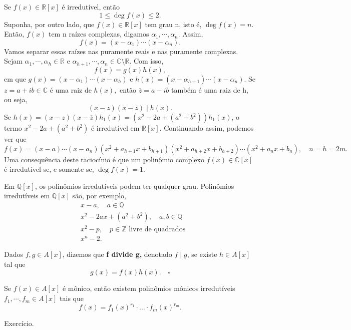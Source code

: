 \documentclass[algebraII_notes.tex]{subfiles}
\begin{document}
Se \(f(x)\in \mathbb{R}[x]\) é irredutível, então
\[
	1\leq \deg{f(x)}\leq 2.
\]
Suponha, por outro lado, que \(f(x)\in \mathbb{R}[x]\) tem grau n, isto é, \(\deg{f(x)} = n.\) Então, \(f(x)\) tem n raízes complexas,
digamos \(\alpha_{1}, \cdots, \alpha_{n}\). Assim,
\[
	f(x) = (x-\alpha_{1})\cdots(x-\alpha_{n}).
\]
Vamos separar essas raízes nas puramente reais e nas puramente complexas. Sejam \(\alpha_{1}, \cdots, \alpha_{h}\in \mathbb{R}\) e
\(\alpha_{h+1}, \cdots, \alpha_{n}\in \mathbb{C}\setminus{\mathbb{R}}.\) Com isso,
\[
	f(x) = g(x)h(x),
\]
em que \(g(x) = (x-\alpha_{1})\cdots(x-\alpha_{h})\) e \(h(x) = (x-\alpha_{h+1})\cdots(x-\alpha_{n}).\)
Se \(z = a + ib\in \mathbb{C}\) é uma raiz de \(h(x),\) então \(\overline{z} = a - ib\) também é uma raiz de h, ou seja,
\[
	(x-z)(x-\overline{z})\mid h(x).
\]
Se \(h(x) = (x-z)(x-\overline{z})h_{1}(x) = (x^{2}-2a + (a^{2}+b^{2}))h_{1}(x)\), o termo
\(x^{2}-2a + (a^{2}+b^{2})\) é irredutível em \(\mathbb{R}[x]\). Continuando assim, podemos ver que
\[
	f(x) = (x-a)\cdots(x-a_{n})(x^{2}+a_{h+1}x + b_{h+1})(x^{2}+a_{h+2}x+b_{h+2})\cdots(x^{2}+a_{n}x + b_{n}),\quad n = h = 2m.
\]
Uma consequência deste raciocínio é que um polinômio complexo \(f(x)\in \mathbb{C}[x]\) é irredutível se, e somente se, \(\deg{f(x)} = 1.\)
\begin{example}
	Em \(\mathbb{Q}[x]\), os polinômios irredutíveis podem ter qualquer grau. Polinômios irredutíveis em \(\mathbb{Q}[x]\)
	são, por exemplo,
	\begin{align*}
		 & x-a,\quad a\in \mathbb{Q}                                 \\
		 & x^{2}-2ax + (a^{2}+b^{2}),\quad a, b\in \mathbb{Q}        \\
		 & x^{2} - p,\quad p\in \mathbb{Z}\text{ livre de quadrados} \\
		 & x^{n} - 2.
	\end{align*}
\end{example}
\begin{def*}
	Dados \(f, g\in A[x]\), dizemos que \textbf{f divide g,} denotado \(f\mid g\), se existe \(h\in A[x]\) tal que
	\[
		g(x) = f(x)h(x).\quad\square
	\]
\end{def*}
\begin{lemma*}
	Se \(f(x)\in A[x]\) é mônico, então existem polinômios mônicos irredutíveis \(f_{1}, \cdots, f_{m}\in A[x]\) tais que
	\[
		f(x) = f_{1}(x)^{r_{1}}\cdot \dotsc \cdot f_{m}(x)^{r_{m}}.
	\]
\end{lemma*}
\begin{proof*}
	Exercício.
\end{proof*}
\end{document}
